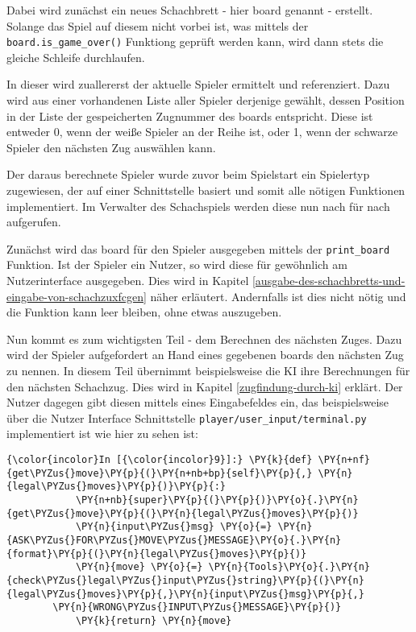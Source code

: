     Dabei wird zunächst ein neues Schachbrett - hier board genannt -
erstellt. Solange das Spiel auf diesem nicht vorbei ist, was mittels der
\texttt{board.is\_game\_over()} Funktiong geprüft werden kann, wird dann
stets die gleiche Schleife durchlaufen.

In dieser wird zuallererst der aktuelle Spieler ermittelt und
referenziert. Dazu wird aus einer vorhandenen Liste aller Spieler
derjenige gewählt, dessen Position in der Liste der gespeicherten
Zugnummer des boards entspricht. Diese ist entweder 0, wenn der weiße
Spieler an der Reihe ist, oder 1, wenn der schwarze Spieler den nächsten
Zug auswählen kann.

Der daraus berechnete Spieler wurde zuvor beim Spielstart ein Spielertyp
zugewiesen, der auf einer Schnittstelle basiert und somit alle nötigen
Funktionen implementiert. Im Verwalter des Schachspiels werden diese nun nach für nach aufgerufen.

Zunächst wird das board für den Spieler ausgegeben mittels der
\texttt{print\_board} Funktion. Ist der Spieler ein Nutzer, so wird
diese für gewöhnlich am Nutzerinterface ausgegeben. Dies wird in Kapitel
\ref{ausgabe-des-schachbretts-und-eingabe-von-schachzuxfcgen} näher erläutert. Andernfalls ist dies nicht nötig und die
Funktion kann leer bleiben, ohne etwas auszugeben.

Nun kommt es zum wichtigsten Teil - dem Berechnen des nächsten Zuges.
Dazu wird der Spieler aufgefordert an Hand eines gegebenen boards den
nächsten Zug zu nennen. In diesem Teil übernimmt beispielsweise die KI
ihre Berechnungen für den nächsten Schachzug. Dies wird in Kapitel
\ref{zugfindung-durch-ki} erklärt. Der Nutzer dagegen gibt diesen mittels eines
Eingabefeldes ein, das beispielsweise über die Nutzer Interface
Schnittstelle \texttt{player/user\_input/terminal.py} implementiert ist
wie hier zu sehen ist:

    \begin{Verbatim}[commandchars=\\\{\}]
{\color{incolor}In [{\color{incolor}9}]:} \PY{k}{def} \PY{n+nf}{get\PYZus{}move}\PY{p}{(}\PY{n+nb+bp}{self}\PY{p}{,} \PY{n}{legal\PYZus{}moves}\PY{p}{)}\PY{p}{:}
            \PY{n+nb}{super}\PY{p}{(}\PY{p}{)}\PY{o}{.}\PY{n}{get\PYZus{}move}\PY{p}{(}\PY{n}{legal\PYZus{}moves}\PY{p}{)}
            \PY{n}{input\PYZus{}msg} \PY{o}{=} \PY{n}{ASK\PYZus{}FOR\PYZus{}MOVE\PYZus{}MESSAGE}\PY{o}{.}\PY{n}{format}\PY{p}{(}\PY{n}{legal\PYZus{}moves}\PY{p}{)}
            \PY{n}{move} \PY{o}{=} \PY{n}{Tools}\PY{o}{.}\PY{n}{check\PYZus{}legal\PYZus{}input\PYZus{}string}\PY{p}{(}\PY{n}{legal\PYZus{}moves}\PY{p}{,}\PY{n}{input\PYZus{}msg}\PY{p}{,} 
		\PY{n}{WRONG\PYZus{}INPUT\PYZus{}MESSAGE}\PY{p}{)}
            \PY{k}{return} \PY{n}{move}
\end{Verbatim}

